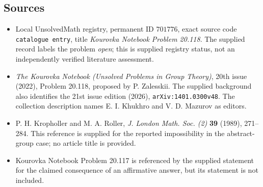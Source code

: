 \documentclass[11pt]{article}
\begin{document}
\subsection{Sources}
\begin{itemize}
\item Local UnsolvedMath registry, permanent ID \(701776\), exact source code \texttt{catalogue entry}, title \emph{Kourovka Notebook Problem 20.118}. The supplied record labels the problem \emph{open}; this is supplied registry status, not an independently verified literature assessment.
\item \emph{The Kourovka Notebook (Unsolved Problems in Group Theory)}, 20th issue (2022), Problem 20.118, proposed by P. Zalesskii. The supplied background also identifies the 21st issue edition (2026), \texttt{arXiv:1401.0300v48}. The collection description names E. I. Khukhro and V. D. Mazurov as editors.
\item P. H. Kropholler and M. A. Roller, \emph{J. London Math. Soc. (2)} \textbf{39} (1989), 271--284. This reference is supplied for the reported impossibility in the abstract-group case; no article title is provided.
\item Kourovka Notebook Problem 20.117 is referenced by the supplied statement for the claimed consequence of an affirmative answer, but its statement is not included.
\end{itemize}
\end{document}
